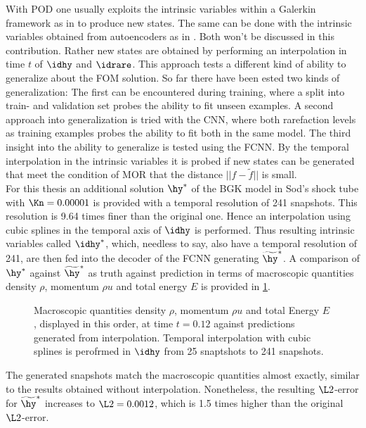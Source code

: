 With POD one usually exploits the intrinsic variables within a Galerkin framework as in \cite{Bernard} to produce new states. The same can be done with the intrinsic variables obtained from autoencoders as in \cite{Carlberg}. Both won't be discussed in this contribution. Rather new states are obtained by performing an interpolation in time \(t\) of \(\idhy\) and \(\idrare\). This approach tests a different kind of ability to generalize about the FOM solution. So far there have been ested two kinds of generalization: The first can be encountered during training, where a split into train- and validation set probes the ability to fit unseen examples. A second approach into generalization is tried with the CNN, where both rarefaction levels as training examples probes the ability to fit both in the same model. The third insight into the ability to generalize is tested using the FCNN. By the temporal interpolation in the intrinsic variables it is probed if new states can be generated that meet the condition of MOR that the distance \(||f - \tilde{f}||\) is small.\\
For this thesis an additional solution \(\hy^*\) of the BGK model in Sod's shock tube with \(\Kn=0.00001\) is provided with a temporal resolution of 241 snapshots. This resolution is 9.64 times finer than the original one. Hence an interpolation using cubic splines in the temporal axis of \(\idhy\) is performed. Thus resulting intrinsic variables called \(\idhy^*\), which, needless to say, also have a temporal resolution of 241, are then fed into the decoder of the FCNN generating \(\widetilde{\hy}^*\). A comparison of \(\hy^*\) against \(\widetilde{\hy}^*\) as truth against prediction in terms of macroscopic quantities density \(\rho\), momentum \(\rho u\) and total energy \(E\) is provided in \cref{Fig: IntHy}.
\begin{figure}[H]
	
	\caption{Macroscopic quantities density \(\rho\), momentum \(\rho u\) and total Energy \(E\), displayed in this order, at time \(t=0.12\) against predictions generated from interpolation. Temporal interpolation with cubic splines is perofrmed in \(\idhy\) from 25 snaptshots to 241 snapshots.}
	\label{Fig: IntHy}
\end{figure}
The generated snapshots match the macroscopic quantities almost exactly, similar to the results obtained without interpolation. Nonetheless, the resulting \(\L2\)-error for \(\widetilde{\hy}^*\) increases to \(\L2=0.0012\), which is 1.5 times higher than the original \(\L2\)-error.\\

